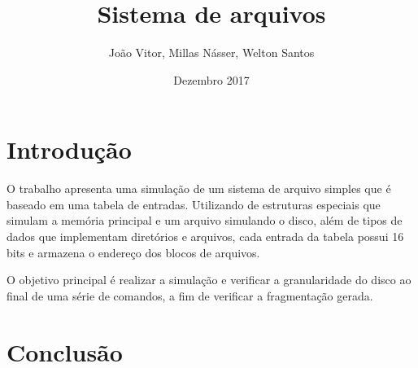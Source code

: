 \documentclass{article}
\title{Sistema de arquivos}
\author{João Vitor, Millas Násser, Welton Santos}
\date{Dezembro 2017}
\begin{document}
\maketitle

\section{Introdução}
	O trabalho apresenta uma simulação de um sistema de arquivo simples que é baseado em uma tabela de entradas. Utilizando de estruturas especiais que simulam a memória principal e um arquivo simulando o disco, além de tipos de dados que implementam diretórios e arquivos, cada entrada da tabela possui 16 bits e  armazena o endereço dos blocos de arquivos. 
	
	O objetivo principal é realizar a simulação e verificar a granularidade do disco ao final de uma série de comandos, a fim de verificar a fragmentação gerada.
    
\section{Conclusão}
    
\end{document}
